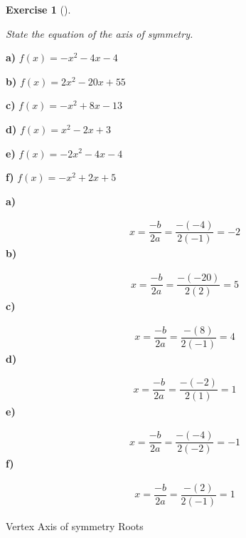 \documentclass[
  letterpaper,
  DIV=11,
  numbers=noendperiod]{scrreprt}
\theoremstyle{definition}
\newtheorem{exercise}{Exercise}[chapter]
\theoremstyle{remark}
\begin{document}
\begin{exercise}[]\protect\hypertarget{exr-u7-26}{}\label{exr-u7-26}

\emph{State the equation of the axis of symmetry.}

\textbf{a)} \(\displaystyle f(x) = -x^2 - 4x - 4\)

\textbf{b)} \(\displaystyle f(x) = 2x^2 - 20x + 55\)

\textbf{c)} \(\displaystyle f(x) = -x^2 + 8x - 13\)

\textbf{d)} \(\displaystyle f(x) = x^2 - 2x + 3\)

\textbf{e)} \(\displaystyle f(x) = -2x^2 - 4x - 4\)

\textbf{f)} \(\displaystyle f(x) = -x^2 + 2x + 5\)

\begin{tcolorbox}[enhanced jigsaw, opacitybacktitle=0.6, coltitle=black, arc=.35mm, colframe=quarto-callout-tip-color-frame, colback=white, bottomrule=.15mm, left=2mm, colbacktitle=quarto-callout-tip-color!10!white, titlerule=0mm, opacityback=0, title=\textcolor{quarto-callout-tip-color}{\faLightbulb}\hspace{0.5em}{🔍 View Solutions}, leftrule=.75mm, breakable, rightrule=.15mm, bottomtitle=1mm, toptitle=1mm, toprule=.15mm]

\textbf{a)}

\[
\begin{aligned}
x = \dfrac{-b}{2a} = \dfrac{-(-4)}{2(-1)} = -2
\end{aligned}
\] \textbf{b)}

\[
\begin{aligned}
x = \dfrac{-b}{2a} = \dfrac{-(-20)}{2(2)} = 5
\end{aligned}
\] \textbf{c)}

\[
\begin{aligned}
x = \dfrac{-b}{2a} = \dfrac{-(8)}{2(-1)} = 4
\end{aligned}
\] \textbf{d)}

\[
\begin{aligned}
x = \dfrac{-b}{2a} = \dfrac{-(-2)}{2(1)} = 1
\end{aligned}
\] \textbf{e)}

\[
\begin{aligned}
x = \dfrac{-b}{2a} = \dfrac{-(-4)}{2(-2)} = -1
\end{aligned}
\] \textbf{f)}

\[
\begin{aligned}
x = \dfrac{-b}{2a} = \dfrac{-(2)}{2(-1)} = 1
\end{aligned}
\]

\end{tcolorbox}

{Vertex} {Axis of symmetry} {Roots}

\end{exercise}
\end{document}
